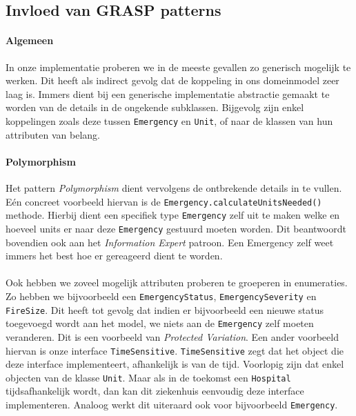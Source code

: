 \label{patterns}
\subsection{Invloed van GRASP patterns}
\label{grasppatterns}
\paragraph{Algemeen}
In onze implementatie proberen we in de meeste gevallen zo generisch mogelijk te werken. Dit heeft als indirect gevolg dat de koppeling in ons domeinmodel zeer laag is. Immers dient bij een generische implementatie abstractie gemaakt te worden van de details in de ongekende subklassen. Bijgevolg zijn enkel koppelingen zoals deze tussen \texttt{Emergency} en \texttt{Unit}, of naar de klassen van hun attributen van belang.
\paragraph{Polymorphism}
Het pattern \textit{Polymorphism} dient vervolgens de ontbrekende details in te vullen. E\'en concreet voorbeeld hiervan is de \texttt{Emergency.calculateUnitsNeeded()} methode. Hierbij dient een specifiek type \texttt{Emergency} zelf uit te maken welke en hoeveel units er naar deze \texttt{Emergency} gestuurd moeten worden. Dit beantwoordt bovendien ook aan het \textit{Information Expert} patroon. Een Emergency zelf weet immers het best hoe er gereageerd dient te worden.
\paragraph{}
Ook hebben we zoveel mogelijk attributen proberen te groeperen in enumeraties. Zo hebben we bijvoorbeeld een \texttt{EmergencyStatus}, \texttt{EmergencySeverity} en \texttt{FireSize}. Dit heeft tot gevolg dat indien er bijvoorbeeld een nieuwe status toegevoegd wordt aan het model, we niets aan de \texttt{Emergency} zelf moeten veranderen. Dit is een voorbeeld van \textit{Protected Variation}. Een ander voorbeeld hiervan is onze interface \texttt{TimeSensitive}. \texttt{TimeSensitive} zegt dat het object die deze interface implementeert, afhankelijk is van de tijd. Voorlopig zijn dat enkel objecten van de klasse \texttt{Unit}. Maar als in de toekomst een \texttt{Hospital} tijdsafhankelijk wordt, dan kan dit ziekenhuis eenvoudig deze interface implementeren. Analoog werkt dit uiteraard ook voor bijvoorbeeld \texttt{Emergency}.
